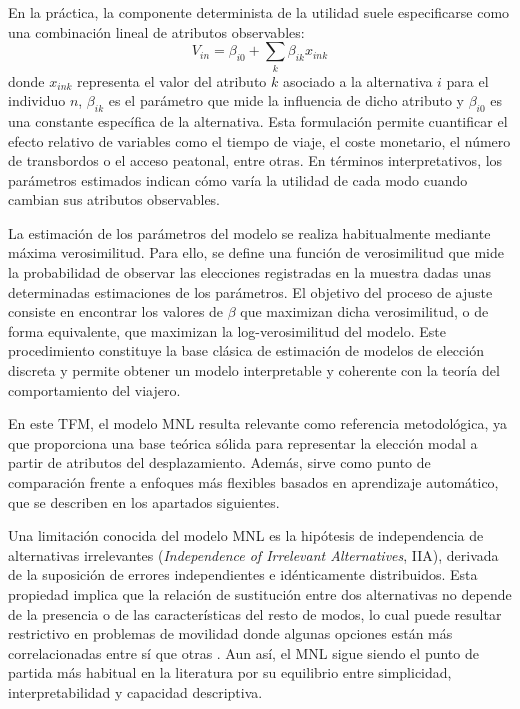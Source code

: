 En la práctica, la componente determinista de la utilidad suele especificarse como una combinación lineal de atributos observables:
\begin{equation}
V_{in} = \beta_{i0} + \sum_{k}\beta_{ik}x_{ink}
\end{equation}
donde $x_{ink}$ representa el valor del atributo $k$ asociado a la alternativa $i$ para el individuo $n$, $\beta_{ik}$ es el parámetro que mide la influencia de dicho atributo y $\beta_{i0}$ es una constante específica de la alternativa. Esta formulación permite cuantificar el efecto relativo de variables como el tiempo de viaje, el coste monetario, el número de transbordos o el acceso peatonal, entre otras. En términos interpretativos, los parámetros estimados indican cómo varía la utilidad de cada modo cuando cambian sus atributos observables.

La estimación de los parámetros del modelo se realiza habitualmente mediante máxima verosimilitud. Para ello, se define una función de verosimilitud que mide la probabilidad de observar las elecciones registradas en la muestra dadas unas determinadas estimaciones de los parámetros. El objetivo del proceso de ajuste consiste en encontrar los valores de $\beta$ que maximizan dicha verosimilitud, o de forma equivalente, que maximizan la log-verosimilitud del modelo. Este procedimiento constituye la base clásica de estimación de modelos de elección discreta y permite obtener un modelo interpretable y coherente con la teoría del comportamiento del viajero.

En este TFM, el modelo MNL resulta relevante como referencia metodológica, ya que proporciona una base teórica sólida para representar la elección modal a partir de atributos del desplazamiento. Además, sirve como punto de comparación frente a enfoques más flexibles basados en aprendizaje automático, que se describen en los apartados siguientes.

Una limitación conocida del modelo MNL es la hipótesis de independencia de alternativas irrelevantes (\textit{Independence of Irrelevant Alternatives}, IIA), derivada de la suposición de errores independientes e idénticamente distribuidos. Esta propiedad implica que la relación de sustitución entre dos alternativas no depende de la presencia o de las características del resto de modos, lo cual puede resultar restrictivo en problemas de movilidad donde algunas opciones están más correlacionadas entre sí que otras \cite{McFadden1974,Train2009}. Aun así, el MNL sigue siendo el punto de partida más habitual en la literatura por su equilibrio entre simplicidad, interpretabilidad y capacidad descriptiva.



